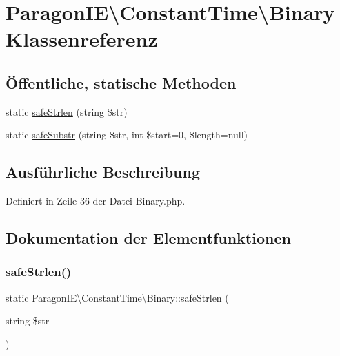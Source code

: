 \hypertarget{class_paragon_i_e_1_1_constant_time_1_1_binary}{}\section{Paragon\+IE\textbackslash{}Constant\+Time\textbackslash{}Binary Klassenreferenz}
\label{class_paragon_i_e_1_1_constant_time_1_1_binary}
\subsection*{Öffentliche, statische Methoden}
\begin{DoxyCompactItemize}
\item 
static \mbox{\hyperlink{class_paragon_i_e_1_1_constant_time_1_1_binary_af104b770a60a6136be053f3c9c7b2008}{safe\+Strlen}} (string \$str)
\item 
static \mbox{\hyperlink{class_paragon_i_e_1_1_constant_time_1_1_binary_ae2c5ed5ced480841330af2d45dfffde4}{safe\+Substr}} (string \$str, int \$start=0, \$length=null)
\end{DoxyCompactItemize}


\subsection{Ausführliche Beschreibung}


Definiert in Zeile 36 der Datei Binary.\+php.



\subsection{Dokumentation der Elementfunktionen}
\mbox{\label{class_paragon_i_e_1_1_constant_time_1_1_binary_af104b770a60a6136be053f3c9c7b2008}} 
\subsubsection{\texorpdfstring{safe\+Strlen()}{safeStrlen()}}
{\footnotesize\ttfamily static Paragon\+I\+E\textbackslash{}\+Constant\+Time\textbackslash{}\+Binary\+::safe\+Strlen (\begin{DoxyParamCaption}\item[{string}]{\$str }\end{DoxyParamCaption})\hspace{0.3cm}{\ttfamily [static]}}

